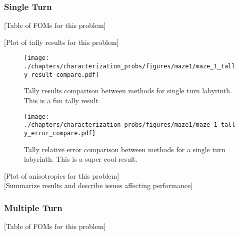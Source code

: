 \subsubsection{Single Turn}
[Table of FOMs for this problem] \\

\begin{table}[h!]
  \centering
  
  \caption[Figure of Merit comparison for single turn maze.]{Figure of Merit
    comparison for single turn maze. The FOMS are
  quantified using three relative error results and two different timing results.
  The relative errors used are the tally average relative error, the tally maximum relative
  error, and the tally minimum relative error; the times are total walltimes for
  the Monte Carlo calculation and the sum of the hybrid method software, the
  deterministic tranport time, and the Monte Carlo calculation time.}
  \label{tab:maze1foms}
\end{table}

[Plot of tally results for this problem] \\

\begin{figure}[h!]
  \centering
  \texttt{[image: ./chapters/characterization\_probs/figures/maze1/maze\_1\_tally\_result\_compare.pdf]}
  \caption[Tally results comparison between methods for single turn labyrinth.]
  {Tally results comparison between methods for single turn labyrinth. This is a fun tally result.}
  \label{fig:maze1result}
\end{figure}

\begin{figure}[h!]
  \centering
  \texttt{[image: ./chapters/characterization\_probs/figures/maze1/maze\_1\_tally\_error\_compare.pdf]}
  \caption[Tally relative error comparison between methods for single turn
  labyrinth]{Tally relative error comparison between methods for a single turn
  labyrinth. This is a super cool result.}
  \label{fig:maze1result}
\end{figure}
[Plot of anisotropies for this problem] \\

[Summarize results and describe issues affecting performance] \\

\subsubsection{Multiple Turn}
[Table of FOMs for this problem]\\

